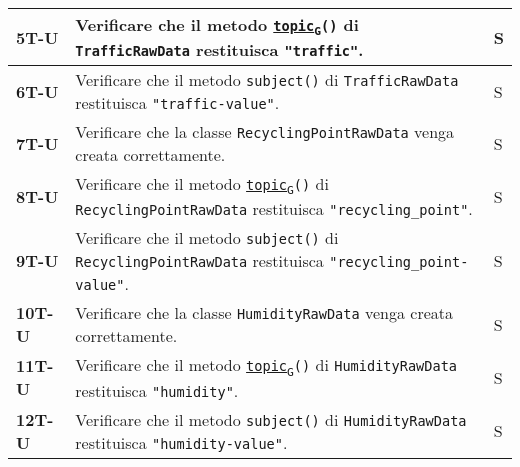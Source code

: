 \begin{longtable}{|>{\raggedright\arraybackslash}m{}|>{\raggedright\arraybackslash}m{}|>{\raggedright\arraybackslash}m{}|}
	\hline
	\textbf{5T-U}   & Verificare che il metodo \texttt{\href{https://7last.github.io/docs/rtb/documentazione-interna/glossario\#topic}{topic\textsubscript{G}}()} di \texttt{TrafficRawData} restituisca \texttt{"traffic"}.                                           & S              \\
	\hline
	\textbf{6T-U}   & Verificare che il metodo \texttt{subject()} di \texttt{TrafficRawData} restituisca \texttt{"traffic-value"}.                                                                                                                                     & S              \\
	\hline
	\textbf{7T-U}   & Verificare che la classe \texttt{RecyclingPointRawData} venga creata correttamente.                                                                                                                                                              & S              \\
	\hline
	\textbf{8T-U}   & Verificare che il metodo \texttt{\href{https://7last.github.io/docs/rtb/documentazione-interna/glossario\#topic}{topic\textsubscript{G}}()} di \texttt{RecyclingPointRawData} restituisca \texttt{"recycling\_point"}.                           & S              \\
	\hline
	\textbf{9T-U}   & Verificare che il metodo \texttt{subject()} di \texttt{RecyclingPointRawData} restituisca \texttt{"recycling\_point-value"}.                                                                                                                     & S              \\
	\hline
	\textbf{10T-U}  & Verificare che la classe \texttt{HumidityRawData} venga creata correttamente.                                                                                                                                                                    & S              \\
	\hline
	\textbf{11T-U}  & Verificare che il metodo \texttt{\href{https://7last.github.io/docs/rtb/documentazione-interna/glossario\#topic}{topic\textsubscript{G}}()} di \texttt{HumidityRawData} restituisca \texttt{"humidity"}.                                         & S              \\
	\hline
	\textbf{12T-U}  & Verificare che il metodo \texttt{subject()} di \texttt{HumidityRawData} restituisca \texttt{"humidity-value"}.                                                                                                                                   & S              \\

\end{longtable}
